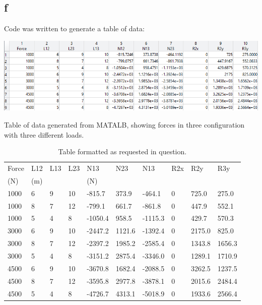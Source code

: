 \documentclass[11pt]{article}
\numberwithin{equation}{section}
\begin{document}
\subsection{f}
Code was written to generate a table of data:

\begin{table}[H]
    \centering
    \includegraphics[width = \textwidth]{./img/q2f.png}
    \caption{Table of data generated from MATALB, showing forces in three configuration with three different loads.}
\end{table}
\begin{table}[H]
    \centering
    \begin{tabular}{llllllllll}
        \toprule
        Force & L12 & L13 & L23 & N13 & N23 & N13 & R2x & R2y & R3y\\
        (\si{\newton}) & (\si{\metre}) & & & (\si{\newton}) & & & & \\
        \midrule
        1000 & 6 & 9 & 10 & -815.7  & 373.9  & -464.1  & 0 & 725.0  & 275.0  \\
        1000 & 8 & 7 & 12 & -799.1  & 661.7  & -861.8  & 0 & 447.9  & 552.1  \\
        1000 & 5 & 4 & 8  & -1050.4 & 958.5  & -1115.3 & 0 & 429.7  & 570.3  \\
        3000 & 6 & 9 & 10 & -2447.2 & 1121.6 & -1392.4 & 0 & 2175.0 & 825.0  \\
        3000 & 8 & 7 & 12 & -2397.2 & 1985.2 & -2585.4 & 0 & 1343.8 & 1656.3 \\
        3000 & 5 & 4 & 8  & -3151.2 & 2875.4 & -3346.0 & 0 & 1289.1 & 1710.9 \\
        4500 & 6 & 9 & 10 & -3670.8 & 1682.4 & -2088.5 & 0 & 3262.5 & 1237.5 \\
        4500 & 8 & 7 & 12 & -3595.8 & 2977.8 & -3878.1 & 0 & 2015.6 & 2484.4 \\
        4500 & 5 & 4 & 8  & -4726.7 & 4313.1 & -5018.9 & 0 & 1933.6 & 2566.4 \\
        \bottomrule
    \end{tabular}
    \caption{Table formatted as requested in question.}
\end{table}
\end{document}
